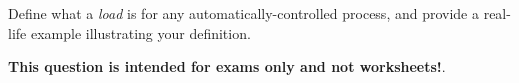 

Define what a {\it load} is for any automatically-controlled process, and provide a real-life example illustrating your definition.

\vskip 50pt














{\bf This question is intended for exams only and not worksheets!}.



